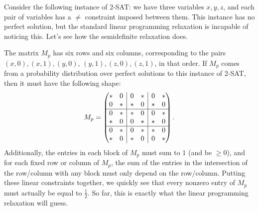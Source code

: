 \documentclass[letterpaper,11pt]{article}
\begin{document}
\begin{ex} Consider the following instance of 2-SAT: we have three variables $x,y,z$, and each pair of variables has a $\ne$ constraint imposed between them. This instance has no perfect solution, but the standard linear programming relaxation is incapable of noticing this. Let's see how the semidefinite relaxation does.

The matrix $M_p$ has six rows and six columns, corresponding to the pairs $(x,0),(x,1),(y,0)$, $(y,1),(z,0),(z,1)$, in that order. If $M_p$ comes from a probability distribution over perfect solutions to this instance of 2-SAT, then it must have the following shape:
\[
M_p = \begin{pmatrix}\begin{matrix} * & 0\\ 0 & *\end{matrix} & \rvline & \begin{matrix} 0 & *\\ * & 0\end{matrix} & \rvline & \begin{matrix} 0 & *\\ * & 0\end{matrix}\\
\hline \begin{matrix} 0 & *\\ * & 0\end{matrix} & \rvline & \begin{matrix} * & 0\\ 0 & *\end{matrix} & \rvline & \begin{matrix} 0 & *\\ * & 0\end{matrix}\\
\hline \begin{matrix} 0 & *\\ * & 0\end{matrix} & \rvline & \begin{matrix} 0 & *\\ * & 0\end{matrix} & \rvline & \begin{matrix} * & 0\\ 0 & *\end{matrix}\end{pmatrix}.
\]
Additionally, the entries in each block of $M_p$ must sum to $1$ (and be $\ge 0$), and for each fixed row or column of $M_p$, the sum of the entries in the intersection of the row/column with any block must only depend on the row/column. Putting these linear constraints together, we quickly see that every nonzero entry of $M_p$ must actually be equal to $\frac{1}{2}$. So far, this is exactly what the linear programming relaxation will guess.


\end{ex}
\end{document}
